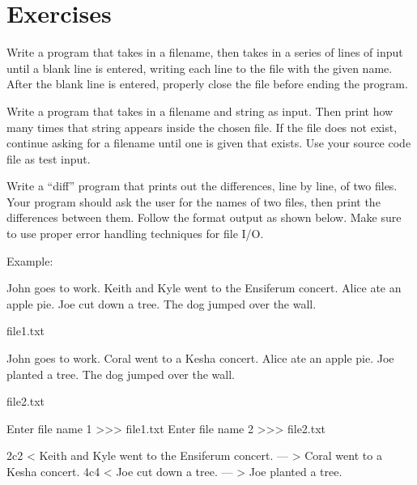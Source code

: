 \documentclass[11pt]{cselabheader}
\begin{document}
\pagebreak
\section{Exercises}
\label{sec:ex}

\begin{ex}[save.py] Write a program that takes in a filename, then takes in
  a series of lines of input until a blank line is entered, writing each line to
  the file with the given name. After the blank line is entered, properly close
  the file before ending the program.
\end{ex}

\begin{ex} Write a program that
  takes in a filename and string as input. Then print how many times that string
  appears inside the chosen file. If the file does not exist, continue asking
  for a filename until one is given that exists. Use your source code file as
  test input.
\end{ex}

\begin{ex}[diff.py]
  Write a ``diff'' program that prints out the differences, line by line, of
  two files.  Your program should ask the user for the names of two files,
  then print the differences between them.  Follow the format output as shown
  below. Make sure to use proper error handling techniques for file I/O.

  Example:

  \begin{listing}[H]
    \vspace{-0.5em}
    \begin{verbatimcode}
John goes to work.
Keith and Kyle went to the Ensiferum concert.
Alice ate an apple pie.
Joe cut down a tree.
The dog jumped over the wall.
    \end{verbatimcode}
    \vspace{-0.5em}
    \caption{file1.txt}
    \vspace{-0.5em}
  \end{listing}

  \begin{listing}[H]
    \vspace{-0.5em}
    \begin{verbatimcode}
John goes to work.
Coral went to a Kesha concert.
Alice ate an apple pie.
Joe planted a tree.
The dog jumped over the wall.
    \end{verbatimcode}
    \vspace{-0.5em}
    \caption{file2.txt}
    \vspace{-0.5em}
  \end{listing}

  \begin{verbatimcode}
Enter file name 1 >>> file1.txt
Enter file name 2 >>> file2.txt

2c2
< Keith and Kyle went to the Ensiferum concert.
---
> Coral went to a Kesha concert.
4c4
< Joe cut down a tree.
---
> Joe planted a tree.
  \end{verbatimcode}
\end{ex}
\end{document}
